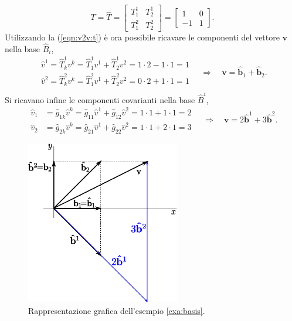 \begin{equation}
 T = \hat{T} = \begin{bmatrix} T^1_1 & T^1_2 \\ T^2_1 & T^2_2 \end{bmatrix} =
 \begin{bmatrix} 1 & 0 \\ -1 & 1 \end{bmatrix} .
\end{equation}
Utilizzando la (\ref{eqn:v2v:t}) è ora possibile ricavare le componenti del vettore $\bm{v}$ nella base $\hat{B}_i$,
\begin{equation}
\begin{aligned}
 \hat{v}^1 = \hat{T}^1_k v^k = \hat{T}^1_1 v^1 + \hat{T}^1_2 v^2 = 
             1 \cdot 2 - 1 \cdot 1 = 1 \\
 \hat{v}^2 = \hat{T}^2_k v^k = \hat{T}^2_1 v^1 + \hat{T}^2_2 v^2 = 
             0 \cdot 2 + 1 \cdot 1 = 1 \\
\end{aligned}
\quad \Rightarrow \quad 
 \bm{v} = \bm{\hat{b}}_1 + \bm{\hat{b}}_2 .
\end{equation}
Si ricavano infine le componenti covarianti nella base $\hat{B}^i$,
\begin{equation}
\begin{aligned}
 \hat{v}_1 & = \hat{g}_{1k} \hat{v}^k = 
   \hat{g}_{11} \hat{v}^1 + \hat{g}_{12} \hat{v}^2 = 
   1 \cdot 1 + 1 \cdot 1 = 2 \\
 \hat{v}_2 & = \hat{g}_{2k} \hat{v}^k = 
   \hat{g}_{21} \hat{v}^1 + \hat{g}_{22} \hat{v}^2 = 
   1 \cdot 1 + 2 \cdot 1 = 3 
\end{aligned}
\quad \Rightarrow \quad 
 \bm{v} = 2 \bm{\hat{b}}^1 + 3 \bm{\hat{b}}^2 .
\end{equation}
%
\begin{figure}
\centering
   \includegraphics[width=0.60\textwidth]{./fig/ese_basis2.eps}
 \caption{Rappresentazione grafica dell'esempio \ref{exa:basis}.}
\end{figure}
